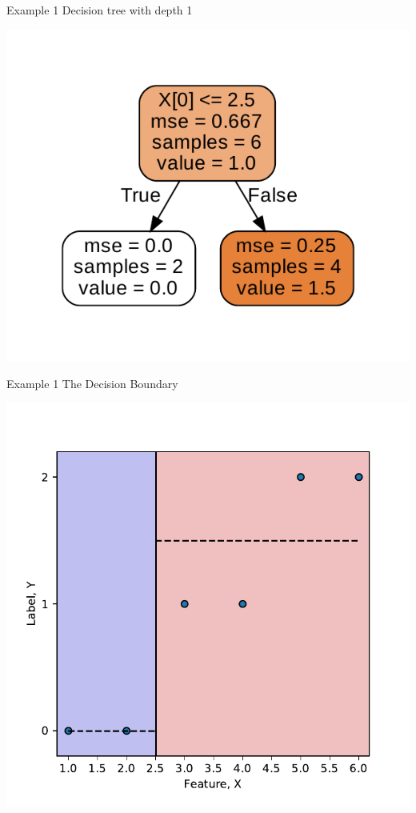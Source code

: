 \documentclass{beamer}
\begin{document}
\begin{frame}{Example 1}
Decision tree with depth 1
\begin{center}
\includegraphics[scale=1]{decision-trees-regression/imgs/depth-1-decision-tree}	
\end{center}
\end{frame}

\begin{frame}{Example 1}
The Decision Boundary
\begin{center}
\includegraphics[scale=0.5]{decision-trees-regression/imgs/depth-1-tree}
\end{center}
\end{frame}
\end{document}
